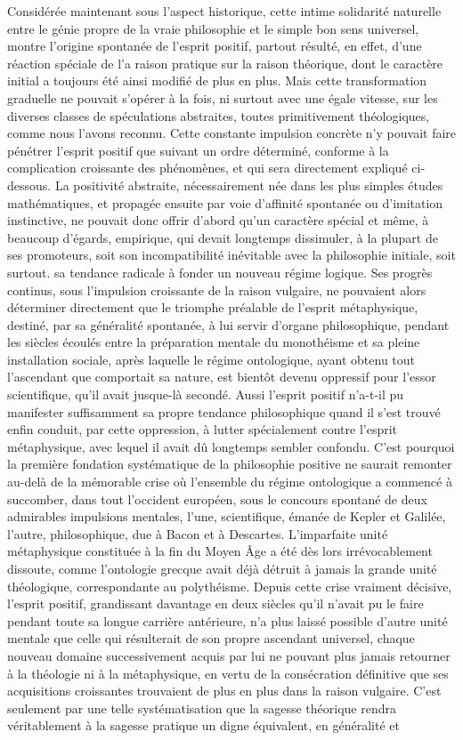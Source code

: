 \documentclass[french,twoside]{book} %
\begin{document}
Considérée maintenant sous l’aspect historique, cette intime solidarité naturelle entre le génie propre de la vraie philosophie et le simple bon sens universel, montre l’origine spontanée de l’esprit positif, partout résulté, en effet, d’une réaction spéciale de l’a raison pratique sur la raison théorique, dont le caractère initial a toujours été ainsi modifié de plus en plus. Mais cette transformation graduelle ne pouvait s’opérer à la fois, ni surtout avec une égale vitesse, sur les diverses classes de spéculations abstraites, toutes primitivement théologiques, comme nous l’avons reconnu. Cette constante impulsion concrète n’y pouvait faire pénétrer l’esprit positif que suivant un ordre déterminé, conforme à la complication croissante des phénomènes, et qui sera directement expliqué ci-dessous. La positivité abstraite, nécessairement née dans les plus simples études mathématiques, et propagée ensuite par voie d’affinité spontanée ou d’imitation instinctive, ne pouvait donc offrir d’abord qu’un caractère spécial et même, à beaucoup d’égards, empirique, qui devait longtemps dissimuler, à la plupart de ses promoteurs, soit son incompatibilité inévitable avec la philosophie initiale, soit surtout. sa tendance radicale à fonder un nouveau régime logique. Ses progrès continus, sous l’impulsion croissante de la raison vulgaire, ne pouvaient alors déterminer directement que le triomphe préalable de l’esprit métaphysique, destiné, par sa généralité spontanée, à lui servir d’organe philosophique, pendant les siècles écoulés entre la préparation mentale du monothéisme et sa pleine installation sociale, après laquelle le régime ontologique, ayant obtenu tout l’ascendant que comportait sa nature, est bientôt devenu oppressif pour l’essor scientifique, qu’il avait jusque-là secondé. Aussi l’esprit positif n’a-t-il pu manifester suffisamment sa propre tendance philosophique quand il s’est trouvé enfin conduit, par cette oppression, à lutter spécialement contre l’esprit métaphysique, avec lequel il avait dû longtemps sembler confondu. C’est pourquoi la première fondation systématique de la philosophie positive ne saurait remonter au-delà de la mémorable crise où l’ensemble du régime ontologique a commencé à succomber, dans tout l’occident européen, sous le concours spontané de deux admirables impulsions mentales, l’une, scientifique, émanée de Kepler et Galilée, l’autre, philosophique, due à Bacon et à Descartes. L’imparfaite unité métaphysique constituée à la fin du Moyen Âge a été dès lors irrévocablement dissoute, comme l’ontologie grecque avait déjà détruit à jamais la grande unité théologique, correspondante au polythéisme. Depuis cette crise vraiment décisive, l’esprit positif, grandissant davantage en deux siècles qu’il n’avait pu le faire pendant toute sa longue carrière antérieure, n’a plus laissé possible d’autre unité mentale que celle qui résulterait de son propre ascendant universel, chaque nouveau domaine successivement acquis par lui ne pouvant plus jamais retourner à la théologie ni à la métaphysique, en vertu de la consécration définitive que ses acquisitions croissantes trouvaient de plus en plus dans la raison vulgaire. C’est seulement par une telle systématisation que la sagesse théorique rendra véritablement à la sagesse pratique un digne équivalent, en généralité et 
\end{document}
